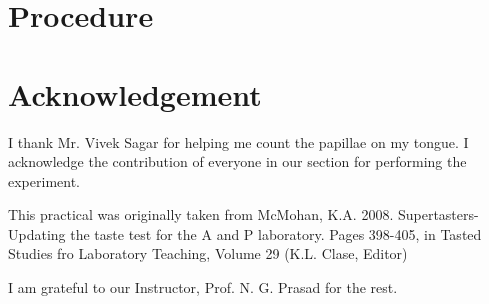 \section{Procedure}
	
	
\section{Acknowledgement}
	I thank Mr. Vivek Sagar for helping me count the papillae on my tongue. I acknowledge the contribution of everyone in our section for performing the experiment.
	\par
	This practical was originally taken from McMohan, K.A. 2008. Supertasters-Updating the taste test for the A and P laboratory. Pages 398-405, in Tasted Studies fro Laboratory Teaching, Volume 29 (K.L. Clase, Editor)
	\par
	I am grateful to our Instructor, Prof. N. G. Prasad for the rest.